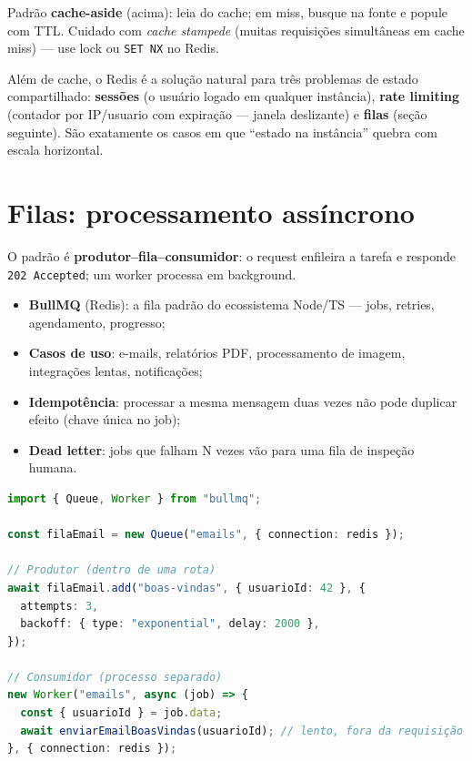 \begin{caixadica}
Padrão \textbf{cache-aside} (acima): leia do cache; em miss, busque na fonte e
popule com TTL. Cuidado com \emph{cache stampede} (muitas requisições
simultâneas em cache miss) — use lock ou \texttt{SET NX} no Redis.
\end{caixadica}

Além de cache, o Redis é a solução natural para três problemas de estado
compartilhado: \textbf{sessões} (o usuário logado em qualquer instância),
\textbf{rate limiting} (contador por IP/usuario com expiração — janela
deslizante) e \textbf{filas} (seção seguinte). São exatamente os casos em que
``estado na instância'' quebra com escala horizontal.

\section{Filas: processamento assíncrono}

O padrão é \textbf{produtor--fila--consumidor}: o request enfileira a tarefa e
responde \texttt{202 Accepted}; um worker processa em background.

\begin{itemize}[leftmargin=*, itemsep=0.4em]
  \item \textbf{BullMQ} (Redis): a fila padrão do ecossistema Node/TS — jobs, retries, agendamento, progresso;
  \item \textbf{Casos de uso}: e-mails, relatórios PDF, processamento de imagem, integrações lentas, notificações;
  \item \textbf{Idempotência}: processar a mesma mensagem duas vezes não pode duplicar efeito (chave única no job);
  \item \textbf{Dead letter}: jobs que falham N vezes vão para uma fila de inspeção humana.
\end{itemize}

\begin{lstlisting}[style=livro, language=TypeScript,
  caption={Produtor e consumidor com BullMQ.}, label={list:arq-fila}]
import { Queue, Worker } from "bullmq";

const filaEmail = new Queue("emails", { connection: redis });

// Produtor (dentro de uma rota)
await filaEmail.add("boas-vindas", { usuarioId: 42 }, {
  attempts: 3,
  backoff: { type: "exponential", delay: 2000 },
});

// Consumidor (processo separado)
new Worker("emails", async (job) => {
  const { usuarioId } = job.data;
  await enviarEmailBoasVindas(usuarioId); // lento, fora da requisição
}, { connection: redis });
\end{lstlisting}

